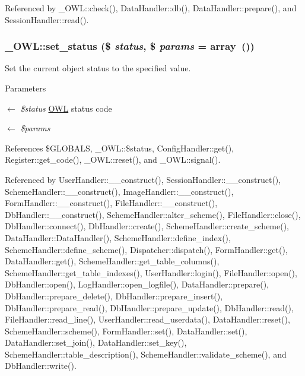 Referenced by \_\-OWL::check(), DataHandler::db(), DataHandler::prepare(), and SessionHandler::read().

\subsubsection[{set\_\-status}]{\setlength{\rightskip}{0pt plus 5cm}\_\-OWL::set\_\-status (\$ {\em status}, \/  \$ {\em params} = {\ttfamily array~()})}\label{class__OWL_aea912d0ede9b3c2a69b79072d94d4787}
Set the current object status to the specified value.


\begin{DoxyParams}{Parameters}
\item[\mbox{$\leftarrow$} {\em \$status}]\hyperlink{classOWL}{OWL} status code \item[\mbox{$\leftarrow$} {\em \$params}]\end{DoxyParams}


References \$GLOBALS, \_\-OWL::\$status, ConfigHandler::get(), Register::get\_\-code(), \_\-OWL::reset(), and \_\-OWL::signal().



Referenced by UserHandler::\_\-\_\-construct(), SessionHandler::\_\-\_\-construct(), SchemeHandler::\_\-\_\-construct(), ImageHandler::\_\-\_\-construct(), FormHandler::\_\-\_\-construct(), FileHandler::\_\-\_\-construct(), DbHandler::\_\-\_\-construct(), SchemeHandler::alter\_\-scheme(), FileHandler::close(), DbHandler::connect(), DbHandler::create(), SchemeHandler::create\_\-scheme(), DataHandler::DataHandler(), SchemeHandler::define\_\-index(), SchemeHandler::define\_\-scheme(), Dispatcher::dispatch(), FormHandler::get(), DataHandler::get(), SchemeHandler::get\_\-table\_\-columns(), SchemeHandler::get\_\-table\_\-indexes(), UserHandler::login(), FileHandler::open(), DbHandler::open(), LogHandler::open\_\-logfile(), DataHandler::prepare(), DbHandler::prepare\_\-delete(), DbHandler::prepare\_\-insert(), DbHandler::prepare\_\-read(), DbHandler::prepare\_\-update(), DbHandler::read(), FileHandler::read\_\-line(), UserHandler::read\_\-userdata(), DataHandler::reset(), SchemeHandler::scheme(), FormHandler::set(), DataHandler::set(), DataHandler::set\_\-join(), DataHandler::set\_\-key(), SchemeHandler::table\_\-description(), SchemeHandler::validate\_\-scheme(), and DbHandler::write().

